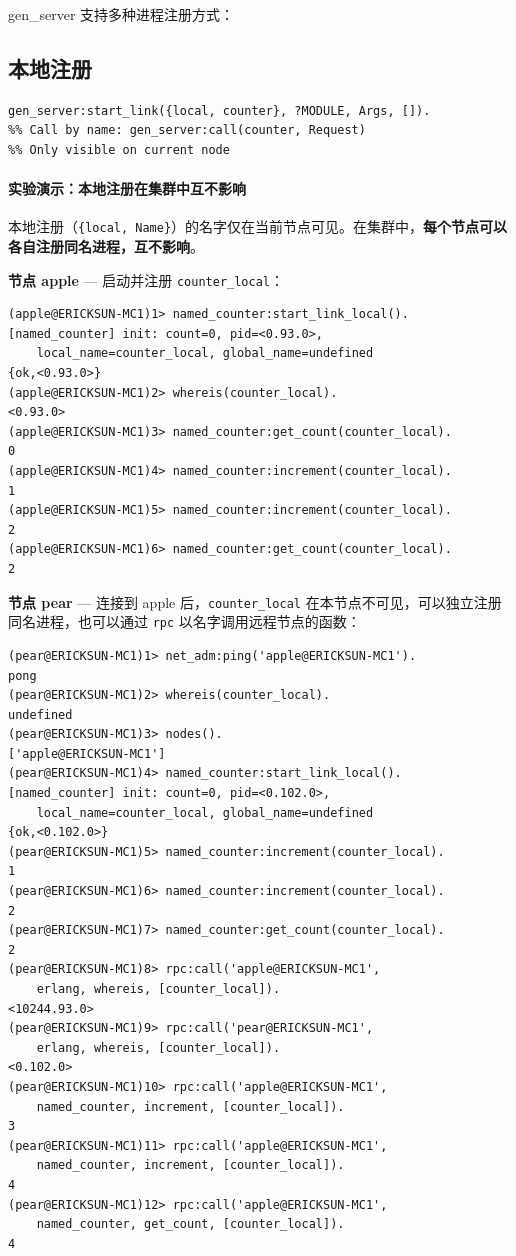 \documentclass[a4paper,11pt]{article}
\begin{document}
gen\_server 支持多种进程注册方式：

\subsection{本地注册}

\begin{lstlisting}[style=erlangstyle]
gen_server:start_link({local, counter}, ?MODULE, Args, []).
%% Call by name: gen_server:call(counter, Request)
%% Only visible on current node
\end{lstlisting}

\paragraph{实验演示：本地注册在集群中互不影响}

本地注册（\texttt{\{local, Name\}}）的名字仅在当前节点可见。在集群中，\textbf{每个节点可以各自注册同名进程，互不影响}。

\textbf{节点 apple} --- 启动并注册 \texttt{counter\_local}：

\begin{lstlisting}[style=shellstyle, caption={apple 节点 --- 本地注册 counter\_local}]
(apple@ERICKSUN-MC1)1> named_counter:start_link_local().
[named_counter] init: count=0, pid=<0.93.0>,
    local_name=counter_local, global_name=undefined
{ok,<0.93.0>}
(apple@ERICKSUN-MC1)2> whereis(counter_local).
<0.93.0>
(apple@ERICKSUN-MC1)3> named_counter:get_count(counter_local).
0
(apple@ERICKSUN-MC1)4> named_counter:increment(counter_local).
1
(apple@ERICKSUN-MC1)5> named_counter:increment(counter_local).
2
(apple@ERICKSUN-MC1)6> named_counter:get_count(counter_local).
2
\end{lstlisting}

\textbf{节点 pear} --- 连接到 apple 后，\texttt{counter\_local} 在本节点不可见，可以独立注册同名进程，也可以通过 \texttt{rpc} 以名字调用远程节点的函数：

\begin{lstlisting}[style=shellstyle, caption={pear 节点 --- 独立注册同名 counter\_local 并通过 rpc 调用远程}]
(pear@ERICKSUN-MC1)1> net_adm:ping('apple@ERICKSUN-MC1').
pong
(pear@ERICKSUN-MC1)2> whereis(counter_local).
undefined
(pear@ERICKSUN-MC1)3> nodes().
['apple@ERICKSUN-MC1']
(pear@ERICKSUN-MC1)4> named_counter:start_link_local().
[named_counter] init: count=0, pid=<0.102.0>,
    local_name=counter_local, global_name=undefined
{ok,<0.102.0>}
(pear@ERICKSUN-MC1)5> named_counter:increment(counter_local).
1
(pear@ERICKSUN-MC1)6> named_counter:increment(counter_local).
2
(pear@ERICKSUN-MC1)7> named_counter:get_count(counter_local).
2
(pear@ERICKSUN-MC1)8> rpc:call('apple@ERICKSUN-MC1',
    erlang, whereis, [counter_local]).
<10244.93.0>
(pear@ERICKSUN-MC1)9> rpc:call('pear@ERICKSUN-MC1',
    erlang, whereis, [counter_local]).
<0.102.0>
(pear@ERICKSUN-MC1)10> rpc:call('apple@ERICKSUN-MC1',
    named_counter, increment, [counter_local]).
3
(pear@ERICKSUN-MC1)11> rpc:call('apple@ERICKSUN-MC1',
    named_counter, increment, [counter_local]).
4
(pear@ERICKSUN-MC1)12> rpc:call('apple@ERICKSUN-MC1',
    named_counter, get_count, [counter_local]).
4
\end{lstlisting}
\end{document}
